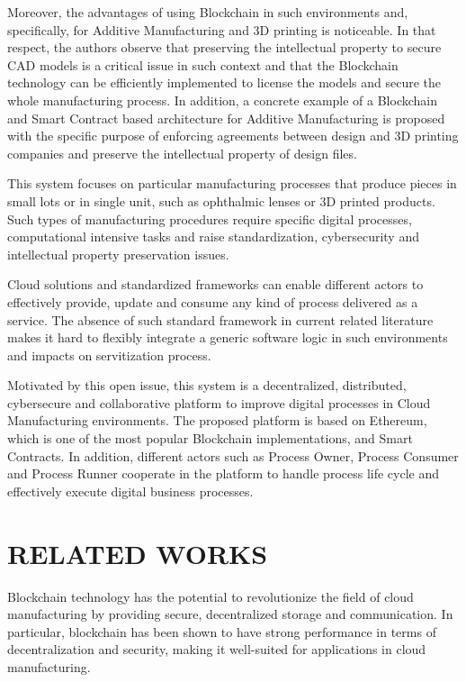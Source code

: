 \documentclass[10pt,a4paper]{report}
\begin{document}
\large\justify Moreover, the advantages of using Blockchain in such environments and, specifically, for Additive Manufacturing and 3D printing is noticeable. In that respect, the authors observe that preserving the intellectual property to secure CAD models is a critical issue in such context and that the Blockchain technology can be efficiently implemented to license the models and secure the whole manufacturing process. In addition, a concrete example of a Blockchain and Smart Contract based architecture for Additive Manufacturing is proposed with the specific purpose of enforcing agreements between design and 3D printing companies and preserve the intellectual property of design files.

\large\justify This system focuses on particular manufacturing processes that produce pieces in small lots or in single unit, such as ophthalmic lenses or 3D printed products. Such types of manufacturing procedures require specific digital processes, computational intensive tasks and raise standardization, cybersecurity and intellectual property preservation issues.

\large\justify Cloud solutions and standardized frameworks can enable different actors to effectively provide, update and consume any kind of process delivered as a service. The absence of such standard framework in current related literature makes it hard to flexibly integrate a generic software logic in such environments and impacts on servitization process.

\large\justify Motivated by this open issue, this system is a decentralized, distributed, cybersecure and collaborative platform to improve digital processes in Cloud Manufacturing environments. The proposed platform is based on Ethereum, which is one of the most popular Blockchain implementations, and Smart Contracts. In addition, different actors such as Process Owner, Process Consumer and Process Runner cooperate in the platform to handle process life cycle and effectively execute digital business processes.


\chapter{	RELATED WORKS}

\thispagestyle{fancy}





\large\justify Blockchain technology has the potential to revolutionize the field of cloud manufacturing by providing secure, decentralized storage and communication. In particular, blockchain has been shown to have strong performance in terms of decentralization and security, making it well-suited for applications in cloud manufacturing.
\end{document}

